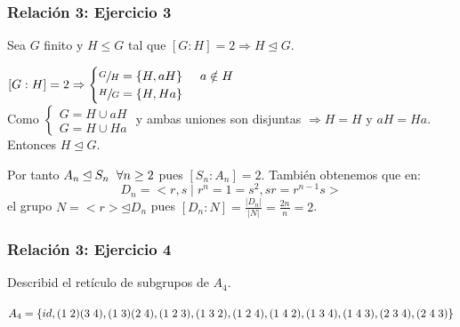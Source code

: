 \documentclass[11pt,a4paper]{article}
\begin{document}

\subsubsection*{Relación 3: Ejercicio 3}

Sea $G$ finito y $H \leqslant G$ tal que $[G:H] = 2 \Rightarrow H \unlhd G$.

$[G:H] = 2 \Rightarrow
\begin{cases}
\sfrac{G}{H} = \{H, aH\} \hspace{0.5cm} a \notin H \\
\sfrac{H}{G} = \{H, Ha\}
\end{cases}$ \\
Como 
$\begin{cases}
G = H \cup aH \\
G = H \cup Ha
\end{cases}$ 
y ambas uniones son disjuntas $\Rightarrow H = H$ y $ aH = Ha$. \\
Entonces $H \unlhd G$.

Por tanto $A_{n} \unlhd S_{n} \hspace{0.2cm} \forall n \geq 2$ pues $[S_{n}:A_{n}] = 2$. También obtenemos que en:
$$D_{n} = <r,s \mid r^{n} = 1 = s^{2}, sr=r^{n-1}s>$$
el grupo $N = <r> \unlhd D_{n}$ pues $[D_{n}:N] = \frac{|D_{n}|}{|N|} = \frac{2n}{n} = 2$.

\subsubsection*{Relación 3: Ejercicio 4}

Describid el retículo de subgrupos de $A_{4}$.

$A_{4} = \{id, (1 \hspace{0.1cm} 2)(3 \hspace{0.1cm} 4), (1 \hspace{0.1cm} 3)(2 \hspace{0.1cm} 4), (1 \hspace{0.1cm} 2 \hspace{0.1cm} 3), (1 \hspace{0.1cm} 3 \hspace{0.1cm} 2), (1 \hspace{0.1cm} 2 \hspace{0.1cm} 4), (1 \hspace{0.1cm} 4 \hspace{0.1cm} 2), (1 \hspace{0.1cm} 3 \hspace{0.1cm} 4), (1 \hspace{0.1cm} 4 \hspace{0.1cm} 3), \\ (2 \hspace{0.1cm} 3 \hspace{0.1cm} 4), (2 \hspace{0.1cm} 4 \hspace{0.1cm} 3)\}$
\end{document}
